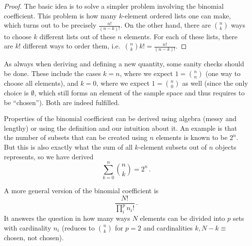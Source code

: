 \begin{proof}
The basic idea is to solve a simpler problem involving the binomial coefficient. This problem is how many $k$-element ordered lists one can make, which turns out to be precisely $\frac{n!}{(n - k)!}$. On the other hand, there are $\binom{n}{k}$ ways to choose $k$ different lists out of these $n$ elements. For each of these lists, there are $k!$ different ways to order them, i.e.~$\binom{n}{k} k! = \frac{n!}{(n - k)!}$.
\end{proof}


As always when deriving and defining a new quantity, some sanity checks should be done. These include the cases $k = n$, where we expect $1 = \binom{n}{n}$ (one way to choose all elements), and $k = 0$, where we expect $1 = \binom{n}{0}$ as well (since the only choice is $\emptyset$, which still forms an element of the sample space and thus requires to be \enquote{chosen}). Both are indeed fulfilled.


Properties of the binomial coefficient can be derived using algebra (messy and lengthy) or using the definition and our intuition about it. An example is that the number of subsets that can be created using $n$ elements is known to be $2^n$. But this is also exactly what the sum of all $k$-element subsets out of $n$ objects represents, so we have derived
\begin{equation}
\sum_{k = 0}^n \binom{n}{k} = 2^n \, .
\end{equation}


A more general version of the binomial coefficient is
\begin{equation}
\frac{N!}{\prod_i^p n_i!} \, .
\end{equation}
It answers the question in how many ways $N$ elements can be divided into $p$ sets with cardinality $n_i$ (reduces to $\binom{n}{k}$ for $p = 2$ and cardinalities $k, N - k \equiv$ chosen, not chosen).


